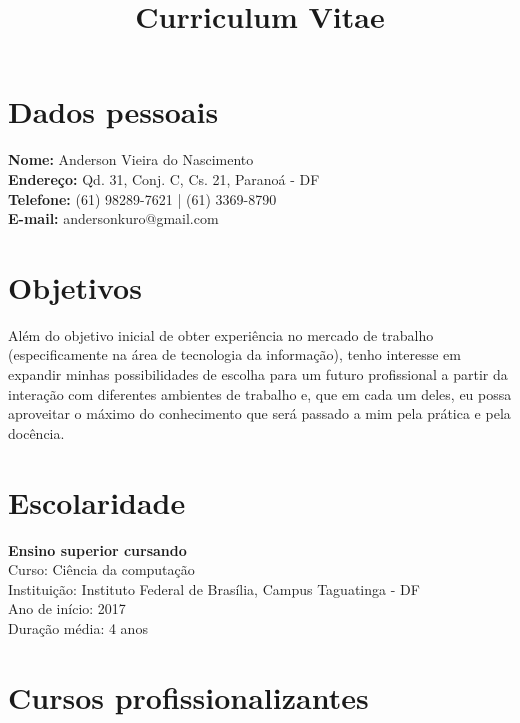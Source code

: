 \documentclass[11pt]{article}
\begin{document}
\title{Curriculum Vitae}
\author{}
\date{}
\maketitle

\section{Dados pessoais}

\textbf{Nome:} Anderson Vieira do Nascimento \\
\textbf{Endereço:} Qd. 31, Conj. C, Cs. 21, Paranoá - DF \\
\textbf{Telefone:} (61) 98289-7621 | (61) 3369-8790\\
\textbf{E-mail:} andersonkuro@gmail.com 

\section{Objetivos}

Além do objetivo inicial de obter experiência no mercado de trabalho (especificamente na área de tecnologia da informação), tenho interesse em expandir minhas possibilidades de escolha para um futuro profissional a partir da interação com diferentes ambientes de trabalho e, que em cada um deles, eu possa aproveitar o máximo do conhecimento que será passado a mim pela prática e pela docência.

\section{Escolaridade}

\textbf{Ensino superior cursando}\\
Curso: Ciência da computação\\
Instituição: Instituto Federal de Brasília, Campus Taguatinga - DF\\
Ano de início: 2017\\
Duração média: 4 anos

\section{Cursos profissionalizantes}
\end{document}
